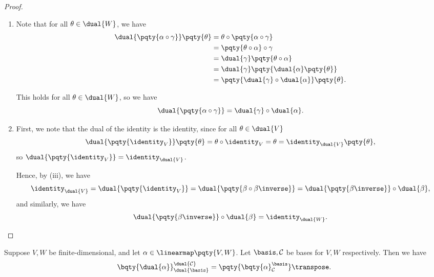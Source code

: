 \begin{proof}
\begin{enumerate}[label=(\roman*)]
        \item Note that for all \(\theta \in \dual{W}\), we have
        \begin{align*}
            \dual{\pqty{\alpha \circ \gamma}}\pqty{\theta} &= \theta \circ \pqty{\alpha \circ \gamma} \\
            &= \pqty{\theta \circ \alpha} \circ \gamma \\
            &= \dual{\gamma}\pqty{\theta \circ \alpha} \\
            &= \dual{\gamma}\pqty{\dual{\alpha}\pqty{\theta}} \\
            &= \pqty{\dual{\gamma} \circ \dual{\alpha}}\pqty{\theta}.
        \end{align*}

        This holds for all \(\theta \in \dual{W}\), so we have
        \[
            \dual{\pqty{\alpha \circ \gamma}} = \dual{\gamma} \circ \dual{\alpha}.
        \]

        \item First, we note that the dual of the identity is the identity, since for all \(\theta \in \dual{V}\)
        \[
            \dual{\pqty{\identity_V}}\pqty{\theta} = \theta \circ \identity_V = \theta = \identity_{\dual{V}}\pqty{\theta},
        \]
        so \(\dual{\pqty{\identity_V}} = \identity_{\dual{V}}\).

        Hence, by (iii), we have
        \[
            \identity_{\dual{V}} = \dual{\pqty{\identity_V}} = \dual{\pqty{\beta \circ \beta\inverse}} = \dual{\pqty{\beta\inverse}} \circ \dual{\beta},
        \]
        and similarly, we have
        \[
            \dual{\pqty{\beta\inverse}} \circ \dual{\beta} = \identity_{\dual{W}}.
        \]
    \end{enumerate}
\end{proof}

\begin{proposition}
    Suppose \(V, W\) be finite-dimensional, and let \(\alpha \in \linearmap\pqty{V, W}\). Let \(\basis, \mathcal{C}\) be bases for \(V, W\) respectively. Then we have
    \[
        \bqty{\dual{\alpha}}^{\dual{\mathcal{C}}}_{\dual{\basis}} = \pqty{\bqty{\alpha}^{\basis}_{\mathcal{C}}}\transpose.
    \]
\end{proposition}


